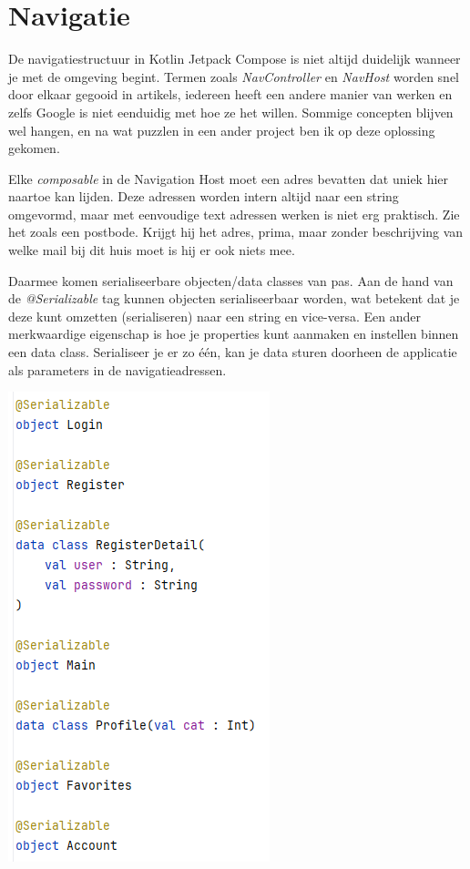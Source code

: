 \documentclass{report}
\begin{document}
\section{Navigatie}
De navigatiestructuur in Kotlin Jetpack Compose is niet altijd duidelijk wanneer je met de omgeving begint.
Termen zoals \textit{NavController} en \textit{NavHost} worden snel door elkaar gegooid in artikels,
iedereen heeft een andere manier van werken en zelfs Google is niet eenduidig met hoe ze het willen.
Sommige concepten blijven wel hangen, en na wat puzzlen in een ander project ben ik op deze oplossing gekomen.

Elke \textit{composable} in de Navigation Host moet een adres bevatten dat uniek hier naartoe kan lijden.
Deze adressen worden intern altijd naar een string omgevormd, maar met eenvoudige text adressen werken is niet erg praktisch.
Zie het zoals een postbode. Krijgt hij het adres, prima, maar zonder beschrijving van welke mail bij dit huis moet is hij er ook niets mee.

Daarmee komen serialiseerbare objecten/data classes van pas.
Aan de hand van de \textit{@Serializable} tag kunnen objecten serialiseerbaar worden, wat betekent dat je deze kunt omzetten (serialiseren) naar een string en vice-versa.
Een ander merkwaardige eigenschap is hoe je properties kunt aanmaken en instellen binnen een data class.
Serialiseer je er zo één, kan je data sturen doorheen de applicatie als parameters in de navigatieadressen.
\begin{center}
    \includegraphics[scale=0.8]{NAV_Serialisable}
\end{center}
\end{document}
